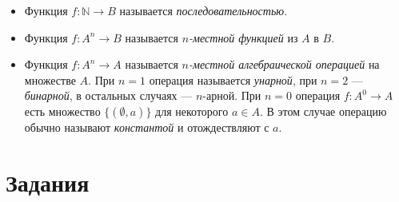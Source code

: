 \begin{itemize}
    \item Функция $f:\mathbb{N}\to B$ называется \emph{последовательностью}.

    \item Функция $f:A^n\to B$ называется \emph{$n$-местной функцией} из $A$ в $B$. 

    \item Функция $f:A^n\to A$ называется \emph{$n$-местной алгебраической операцией} на множестве $A$. При $n=1$ операция называется \emph{унарной}, при $n=2$ --- \emph{бинарной}, в остальных случаях --- $n$-арной. При $n=0$ операция $f:A^0\to A$ есть множество $\{(\emptyset,a)\}$ для некоторого $a\in A$. В этом случае операцию обычно называют \emph{константой} и отождествляют с $a$.
\end{itemize}


\section*{Задания}

